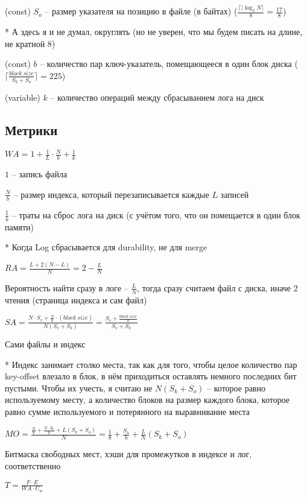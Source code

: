 (const) $S_o$ -- размер указателя на позицию в файле (в байтах) ($ \frac{\lceil\rceil\log_2N\rceil}{8} = \frac{17}{8}$)

* А здесь я и не думал, округлять (но не уверен, что мы будем писать на длине, не кратной 8)

(const) $b$ -- количество пар ключ-указатель, помещающееся в один блок диска ($\lceil\frac{block\ size}{S_k + S_o}\rceil = 225$)

(variable) $k$ -- количество операций между сбрасыванием лога на диск

\subsection*{Метрики}

\large$WA = 1 + \frac{1}{L}\cdot\frac{N}{b} + \frac{1}{k}$\normalsize

$1$ -- запись файла

$\frac{N}{b}$ -- размер индекса, который перезаписывается каждые $L$ записей

$\frac{1}{k}$ -- траты на сброс лога на диск (с учётом того, что он помещается в один блок памяти)

* Когда Log сбрасывается для durability, не для merge

\large$RA = \frac{L + 2(N-L)}{N} = 2 - \frac{L}{N}$\normalsize

Вероятность найти сразу в логе -- $\frac{L}{N}$, тогда сразу считаем файл с диска, иначе 2 чтения (страница индекса и сам файл)

\large$SA = \frac{N\cdot S_v + \frac{N}{b}\cdot (block\ size)}{N(S_v + S_k)} = \frac{S_v + \frac{block\ size}{b}}{S_v + S_k}$\normalsize

Сами файлы и индекс

* Индекс занимает столко места, так как для того, чтобы целое количество пар key-offset влезало в блок, в нём приходиться оставлять немного последних бит пустыми. Чтобы их учесть, я считаю не $N(S_k + S_o)$ -- которое равно используемому месту, а количество блоков на размер каждого блока, которое равно сумме используемого и потерянного на выравнивание места

\large$MO = \frac{\frac{N}{8} + \frac{N\cdot S_h}{b} + L(S_k + S_o)}{N} = \frac{1}{8} + \frac{S_h}{b} + \frac{L}{N}(S_k + S_o)$\normalsize

Битмаска свободных мест, хэши для промежутков в индексе и лог, соответственно

\large$T = \frac{F\cdot E}{WA\cdot U_w}$\normalsize

